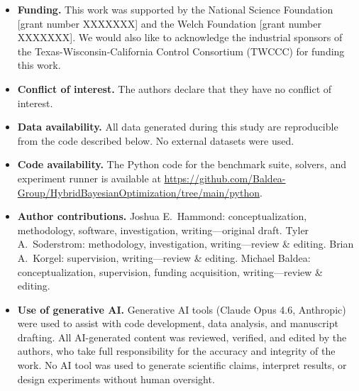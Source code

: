 \documentclass[12pt,a4paper]{article}%
\theoremstyle{plain}%
\theoremstyle{remark}%
\theoremstyle{definition}%
\begin{document}
\begin{itemize}
\item \textbf{Funding.} This work was supported by the National Science Foundation [grant number XXXXXXX] and the Welch Foundation [grant number XXXXXXX]. We would also like to acknowledge the industrial sponsors of the Texas-Wisconsin-California Control Consortium (TWCCC) for funding this work.

\item \textbf{Conflict of interest.} The authors declare that they have no conflict of interest.

\item \textbf{Data availability.} All data generated during this study are reproducible from the code described below. No external datasets were used.

\item \textbf{Code availability.} The Python code for the benchmark suite, solvers, and experiment runner is available at \url{https://github.com/Baldea-Group/HybridBayesianOptimization/tree/main/python}.

\item \textbf{Author contributions.} Joshua E.\ Hammond: conceptualization, methodology, software, investigation, writing---original draft. Tyler A.\ Soderstrom: methodology, investigation, writing---review \& editing. Brian A.\ Korgel: supervision, writing---review \& editing. Michael Baldea: conceptualization, supervision, funding acquisition, writing---review \& editing.

\item \textbf{Use of generative AI.} Generative AI tools (Claude Opus 4.6, Anthropic) were used to assist with code development, data analysis, and manuscript drafting. All AI-generated content was reviewed, verified, and edited by the authors, who take full responsibility for the accuracy and integrity of the work. No AI tool was used to generate scientific claims, interpret results, or design experiments without human oversight.
\end{itemize}
\end{document}

